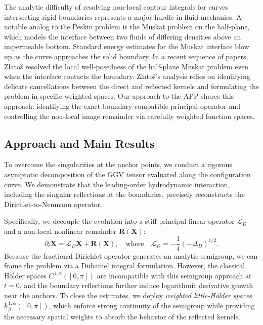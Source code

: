 \documentclass{amsart}
\begin{document}
The analytic difficulty of resolving non-local contour integrals for curves intersecting rigid boundaries represents a major hurdle in fluid mechanics. A notable analog to the Peskin problem is the Muskat problem on the half-plane, which models the interface between two fluids of differing densities above an impermeable bottom. Standard energy estimates for the Muskat interface blow up as the curve approaches the solid boundary. In a recent sequence of papers, Zlatoš \cite{zlatos2024muskat1, zlatos2024muskat2} resolved the local well-posedness of the half-plane Muskat problem even when the interface contacts the boundary. Zlato\v{s}'s analysis  relies on identifying delicate cancellations between the direct and reflected kernels and formulating the problem in specific weighted spaces. Our approach to the APP shares this approach: identifying the exact boundary-compatible principal operator and controlling the non-local image remainder via carefully weighted function spaces.

\subsection{Approach and Main Results}

To overcome the singularities at the anchor points, we conduct a rigorous asymptotic decomposition of the GGV tensor evaluated along the configuration curve. We demonstrate that the leading-order hydrodynamic interaction, including the singular reflections at the boundaries, precisely reconstructs the Dirichlet-to-Neumann operator. 

Specifically, we decouple the evolution into a stiff principal linear operator $\mathcal{L}_D$ and a non-local nonlinear remainder $\mathbf{R}(\mathbf{X})$:
\begin{equation}
    \partial_t \mathbf{X} = \mathcal{L}_D \mathbf{X} + \mathbf{R}(\mathbf{X}), \quad \text{where} \quad \mathcal{L}_D = -\frac{1}{4}(-\Delta_D)^{1/2}.
\end{equation}
Because the fractional Dirichlet operator generates an analytic semigroup, we can frame the problem via a Duhamel integral formulation. However, the classical Hölder spaces $C^{1,\alpha}([0,\pi])$ are incompatible with this semigroup approach at $t=0$, and the boundary reflections further induce logarithmic derivative growth near the anchors. To close the estimates, we deploy \emph{weighted little-H\"{o}lder spaces} $h^{1,\alpha}_\beta([0,\pi])$, which enforce strong continuity of the semigroup while providing the necessary spatial weights to absorb the behavior of the reflected kernels.
\end{document}
